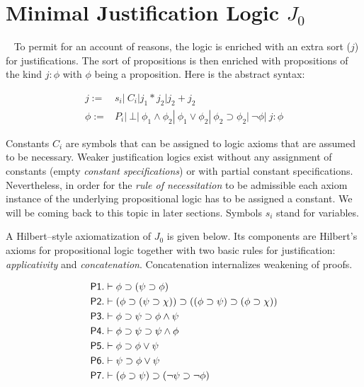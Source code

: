\section{Minimal Justification Logic $J_0$}~\label{min:jo}
To permit for an account of reasons, the logic is enriched with an extra sort ($j$) for justifications. The sort of propositions is then enriched with propositions of the kind $j:\phi$ with $\phi$ being a proposition. Here is the abstract syntax:

\begin{mdframed}
\begin{align*}
j := &s_i|\ C_i| j_1*j_2| j_2 + j_2\\
 \phi:=& P_i|\ \bot|\ \phi_1\wedge\phi_2|\ \phi_1\vee\phi_2| \ \phi_2\supset\phi_2|\ \neg\phi|\ j:\phi   
\end{align*}
\end{mdframed}
Constants $C_i$ are symbols that can be assigned to logic axioms that are assumed to be necessary. Weaker justification logics exist without any assignment of constants (empty \emph{constant specifications}) or with partial constant specifications. Nevertheless, in order for the  \emph{rule of necessitation} to be admissible each axiom instance of the underlying propositional logic has to be assigned a constant. We will be coming back to this topic in later sections. Symbols $s_i$ stand for variables.

A Hilbert--style axiomatization of $J_0$ is given below. Its components are Hilbert's axioms for propositional logic together with two basic rules for justification: \emph{applicativity} and \emph{concatenation}. Concatenation internalizes weakening of proofs.
\begin{mdframed}
\begin{align*}
&\sf{P1}.  \vdash \phi\supset(\psi\supset\phi)\\
& \sf{P2}. \vdash (\phi\supset(\psi\supset\chi))\supset((\phi\supset\psi)\supset(\phi\supset\chi))\\
& \sf{P3}. \vdash \phi\supset\psi\supset\phi\wedge\psi\\
&\sf{P4}. \vdash \phi\supset\psi\supset\psi\wedge\phi\\
&\sf{P5}.  \vdash \phi\supset\phi\vee\psi\\
&\sf{P6}. \vdash \psi\supset\phi\vee\psi\\
&\sf{P7}. \vdash (\phi\supset\psi)\supset(\neg\psi\supset\neg\phi)\\
\end{align*}
\end{mdframed}


